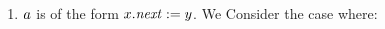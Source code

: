 \begin{enumerate}
\begin{enumerate}
  \item $a$ is of the form $x.{\it next}:=y$.
    We Consider the case where:

\end{enumerate}
\end{enumerate}
